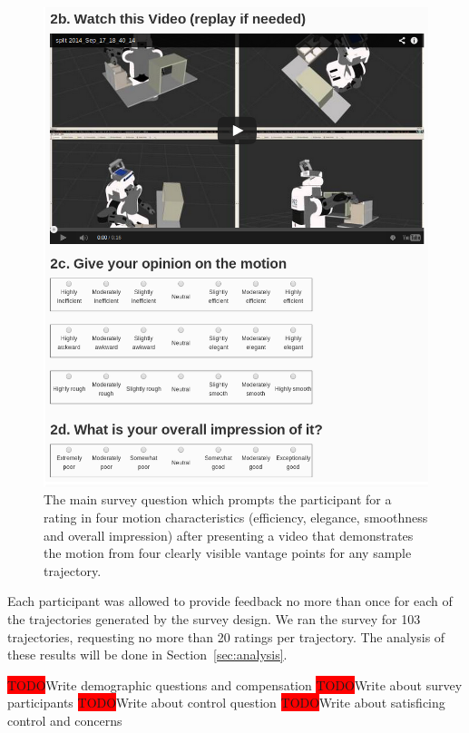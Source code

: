 \documentclass[letterpaper, 10 pt, conference]{ieeeconf}  %
\newcommand{\todo}{\colorbox{red}{TODO}}
\begin{document}
\begin{figure}
    \includegraphics[trim = 0mm 0mm 0mm 0mm, width=\columnwidth]{pictures/amazon_survey_screenshot}
    \caption{The main survey question which prompts the participant for a rating in four motion characteristics (efficiency, elegance, smoothness and overall impression) after presenting a video that demonstrates the motion from four clearly visible vantage points for any sample trajectory.}
    \label{fig:survey_question}
\end{figure}

Each participant was allowed to provide feedback no more than once for each of the trajectories generated by the survey design. We ran the survey for 103 trajectories, requesting no more than 20 ratings per trajectory. The analysis of these results will be done in Section~\ref{sec:analysis}.

\todo Write demographic questions and compensation
\todo Write about survey participants
\todo Write about control question
\todo Write about satisficing control and concerns
\end{document}
